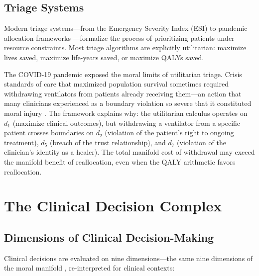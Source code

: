 \documentclass[12pt]{article}
\theoremstyle{definition}
\theoremstyle{remark}
\begin{document}
\subsection{Triage Systems}

Modern triage systems---from the Emergency Severity Index (ESI) \cite{gilboy2011} to pandemic allocation frameworks \cite{emanuel2020}---formalize the process of prioritizing patients under resource constraints.  Most triage algorithms are explicitly utilitarian: maximize lives saved, maximize life-years saved, or maximize QALYs saved.

The COVID-19 pandemic exposed the moral limits of utilitarian triage.  Crisis standards of care that maximized population survival sometimes required withdrawing ventilators from patients already receiving them---an action that many clinicians experienced as a boundary violation so severe that it constituted moral injury \cite{greenberg2020}.  The framework explains why: the utilitarian calculus operates on $d_1$ (maximize clinical outcomes), but withdrawing a ventilator from a specific patient crosses boundaries on $d_2$ (violation of the patient's right to ongoing treatment), $d_5$ (breach of the trust relationship), and $d_7$ (violation of the clinician's identity as a healer).  The total manifold cost of withdrawal may exceed the manifold benefit of reallocation, even when the QALY arithmetic favors reallocation.


\section{The Clinical Decision Complex}
\label{sec:manifold}

\subsection{Dimensions of Clinical Decision-Making}

Clinical decisions are evaluated on nine dimensions---the same nine dimensions of the moral manifold \cite{bond2026geometric}, re-interpreted for clinical contexts:
\end{document}
